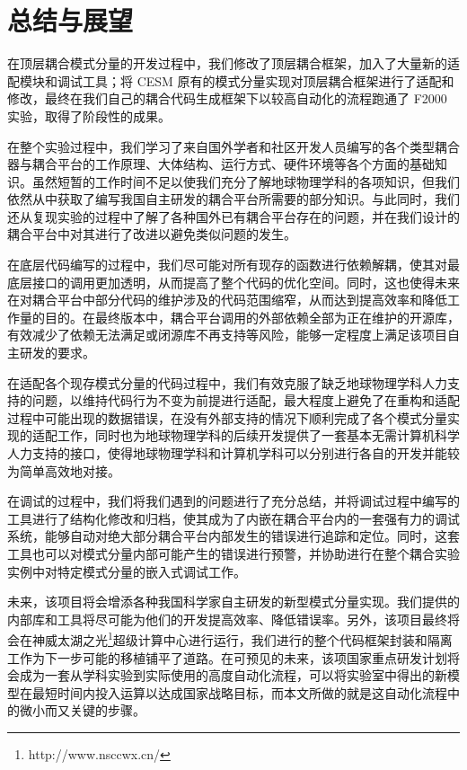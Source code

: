 \chapter{总结与展望}
\label{cha:further}

在顶层耦合模式分量的开发过程中，我们修改了顶层耦合框架，加入了大量新的适配模块和调试工具；将 CESM 原有的模式分量实现对顶层耦合框架进行了适配和修改，最终在我们自己的耦合代码生成框架下以较高自动化的流程跑通了 F2000 实验，取得了阶段性的成果。

在整个实验过程中，我们学习了来自国外学者和社区开发人员编写的各个类型耦合器与耦合平台的工作原理、大体结构、运行方式、硬件环境等各个方面的基础知识。虽然短暂的工作时间不足以使我们充分了解地球物理学科的各项知识，但我们依然从中获取了编写我国自主研发的耦合平台所需要的部分知识。与此同时，我们还从复现实验的过程中了解了各种国外已有耦合平台存在的问题，并在我们设计的耦合平台中对其进行了改进以避免类似问题的发生。

在底层代码编写的过程中，我们尽可能对所有现存的函数进行依赖解耦，使其对最底层接口的调用更加透明，从而提高了整个代码的优化空间。同时，这也使得未来在对耦合平台中部分代码的维护涉及的代码范围缩窄，从而达到提高效率和降低工作量的目的。在最终版本中，耦合平台调用的外部依赖全部为正在维护的开源库，有效减少了依赖无法满足或闭源库不再支持等风险，能够一定程度上满足该项目自主研发的要求。

在适配各个现存模式分量的代码过程中，我们有效克服了缺乏地球物理学科人力支持的问题，以维持代码行为不变为前提进行适配，最大程度上避免了在重构和适配过程中可能出现的数据错误，在没有外部支持的情况下顺利完成了各个模式分量实现的适配工作，同时也为地球物理学科的后续开发提供了一套基本无需计算机科学人力支持的接口，使得地球物理学科和计算机学科可以分别进行各自的开发并能较为简单高效地对接。

在调试的过程中，我们将我们遇到的问题进行了充分总结，并将调试过程中编写的工具进行了结构化修改和归档，使其成为了内嵌在耦合平台内的一套强有力的调试系统，能够自动对绝大部分耦合平台内部发生的错误进行追踪和定位。同时，这套工具也可以对模式分量内部可能产生的错误进行预警，并协助进行在整个耦合实验实例中对特定模式分量的嵌入式调试工作。

未来，该项目将会增添各种我国科学家自主研发的新型模式分量实现。我们提供的内部库和工具将尽可能为他们的开发提高效率、降低错误率。另外，该项目最终将会在神威太湖之光\footnote{http://www.nsccwx.cn/}超级计算中心进行运行，我们进行的整个代码框架封装和隔离工作为下一步可能的移植铺平了道路。在可预见的未来，该项国家重点研发计划将会成为一套从学科实验到实际使用的高度自动化流程，可以将实验室中得出的新模型在最短时间内投入运算以达成国家战略目标，而本文所做的就是这自动化流程中的微小而又关键的步骤。